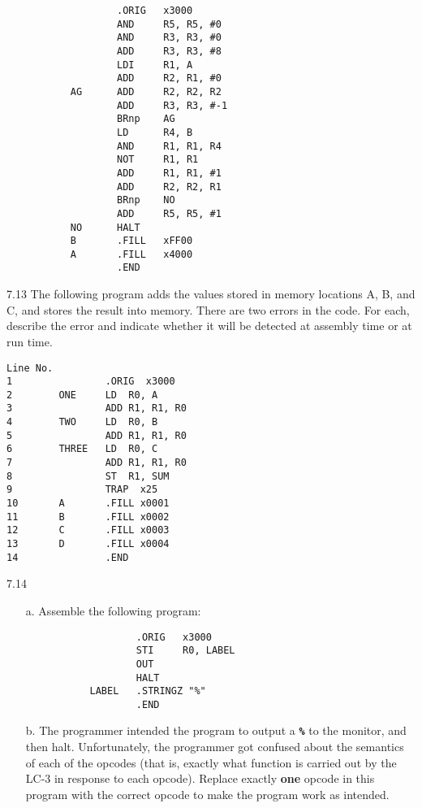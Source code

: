 \documentclass{patt}
\begin{document}
\begin{exercises}
\begin{lstlisting}
                   .ORIG   x3000
                   AND     R5, R5, #0
                   AND     R3, R3, #0
                   ADD     R3, R3, #8
                   LDI     R1, A
                   ADD     R2, R1, #0
           AG      ADD     R2, R2, R2
                   ADD     R3, R3, #-1
                   BRnp    AG
                   LD      R4, B
                   AND     R1, R1, R4
                   NOT     R1, R1
                   ADD     R1, R1, #1
                   ADD     R2, R2, R1
                   BRnp    NO
                   ADD     R5, R5, #1
           NO      HALT
           B       .FILL   xFF00
           A       .FILL   x4000
                   .END
\end{lstlisting}\vspace{4pt}

\item[7.13] The following program adds the values stored in memory
  locations A, B, and C, and stores the result into memory. There are
  two errors in the code. For each, describe the error and indicate
  whether it will be detected at assembly time or at run time.

\medskip

\begin{lstlisting}
Line No.
1                .ORIG  x3000
2        ONE     LD  R0, A
3                ADD R1, R1, R0
4        TWO     LD  R0, B
5                ADD R1, R1, R0
6        THREE   LD  R0, C
7                ADD R1, R1, R0
8                ST  R1, SUM
9                TRAP  x25
10       A       .FILL x0001
11       B       .FILL x0002
12       C       .FILL x0003
13       D       .FILL x0004
14               .END
\end{lstlisting}\newpage

\item[7.14]
\begin{enumerate}[a.]
\item[a.] Assemble the following program:

\begin{lstlisting}
                   .ORIG   x3000
                   STI     R0, LABEL
                   OUT
                   HALT
           LABEL   .STRINGZ "%"
                   .END
\end{lstlisting}

\item[b.]  The programmer intended the program to output a
  {\tt\bfseries \%} to the monitor, and then halt. Unfortunately, the
  programmer got confused about the semantics of each of the opcodes
  (that is, exactly what function is carried out by the LC-3 in
  response to each opcode).  Replace exactly {\bf one} opcode in this
  program with the correct opcode to make the program work as
  intended.


\end{enumerate}
\end{exercises}
\end{document}
